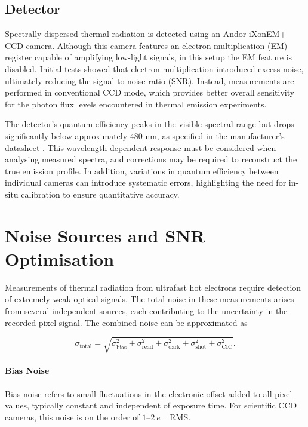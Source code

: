 \documentclass[
	parskip=half,
	a4paper,
]{scrarticle}
\begin{document}
\subsection{Detector}
Spectrally dispersed thermal radiation is detected using an Andor iXonEM+ CCD camera. Although this camera features an electron multiplication (EM) register capable of amplifying low-light signals, in this setup the EM feature is disabled. Initial tests showed that electron multiplication introduced excess noise, ultimately reducing the signal-to-noise ratio (SNR). Instead, measurements are performed in conventional CCD mode, which provides better overall sensitivity for the photon flux levels encountered in thermal emission experiments.

The detector's quantum efficiency peaks in the visible spectral range but drops significantly below approximately 480 nm, as specified in the manufacturer's datasheet \autocite{andor_ixonem_nodate}. This wavelength-dependent response must be considered when analysing measured spectra, and corrections may be required to reconstruct the true emission profile. In addition, variations in quantum efficiency between individual cameras can introduce systematic errors, highlighting the need for in-situ calibration to ensure quantitative accuracy.


\section{Noise Sources and SNR Optimisation}

Measurements of thermal radiation from ultrafast hot electrons require detection of extremely weak optical signals. The total noise in these measurements arises from several independent sources, each contributing to the uncertainty in the recorded pixel signal. The combined noise can be approximated as

\begin{equation}
    \sigma_{\text{total}} = \sqrt{\sigma_{\text{bias}}^2 + \sigma_{\text{read}}^2 + \sigma_{\text{dark}}^2 + \sigma_{\text{shot}}^2 + \sigma_{\text{CIC}}^2}.
\end{equation}

\paragraph{Bias Noise}

Bias noise refers to small fluctuations in the electronic offset added to all pixel values, typically constant and independent of exposure time. For scientific CCD cameras, this noise is on the order of $1$--$2~e^{-}$~RMS.
\end{document}
